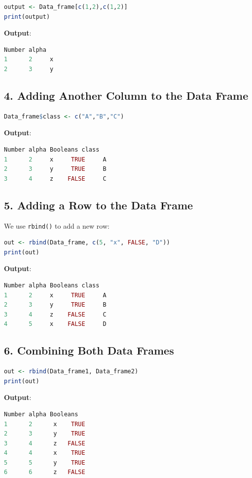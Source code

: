 \documentclass[10pt]{book}
\begin{document}
\begin{lstlisting}[language=R]
output <- Data_frame[c(1,2),c(1,2)]
print(output)
\end{lstlisting}

\textbf{Output}:
\begin{lstlisting}[language=R]
Number alpha
1      2     x
2      3     y
\end{lstlisting}

\subsection*{4. Adding Another Column to the Data Frame}
\begin{lstlisting}[language=R]
Data_frame$class <- c("A","B","C")
\end{lstlisting}

\textbf{Output}:
\begin{lstlisting}[language=R]
Number alpha Booleans class
1      2     x     TRUE     A
2      3     y     TRUE     B
3      4     z    FALSE     C
\end{lstlisting}

\subsection*{5. Adding a Row to the Data Frame}
We use \texttt{rbind()} to add a new row:

\begin{lstlisting}[language=R]
out <- rbind(Data_frame, c(5, "x", FALSE, "D"))
print(out)
\end{lstlisting}

\textbf{Output}:
\begin{lstlisting}[language=R]
Number alpha Booleans class
1      2     x     TRUE     A
2      3     y     TRUE     B
3      4     z    FALSE     C
4      5     x    FALSE     D
\end{lstlisting}

\subsection*{6. Combining Both Data Frames}
\begin{lstlisting}[language=R]
out <- rbind(Data_frame1, Data_frame2)
print(out)
\end{lstlisting}

\textbf{Output}:
\begin{lstlisting}[language=R]
Number alpha Booleans
1      2      x    TRUE
2      3      y    TRUE
3      4      z   FALSE
4      4      x    TRUE
5      5      y    TRUE
6      6      z   FALSE
\end{lstlisting}
\end{document}
